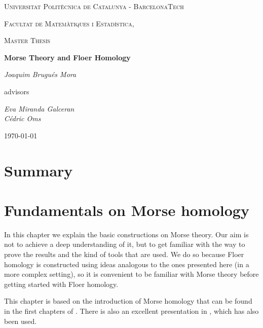 \documentclass[a4paper,11pt]{book}
\begin{document}
\begin{titlepage}
	\centering
	{\scshape\LARGE Universitat Politècnica de Catalunya - BarcelonaTech\par}
	{\scshape\LARGE Facultat de Matemàtiques i Estadística, \par}
	\vspace{1cm}
	{\scshape\Large Master Thesis\par}
	\vspace{1.5cm}
	{\huge\bfseries Morse Theory and Floer Homology\par}
	\vspace{2cm}
	{\Large\itshape Joaquim Brugués Mora\par}
	\vfill
	advisors\par
	{\Large\itshape Eva Miranda Galceran \\ Cédric Oms \par}

	\vfill

	{\large \today\par}
\end{titlepage}


\chapter*{Summary}


\tableofcontents

\mainmatter

\chapter{Fundamentals on Morse homology}
In this chapter we explain the basic constructions on Morse theory. Our aim is not to achieve a deep understanding of it, but to get familiar with the way to prove the results and the kind of tools that are used. We do so because Floer homology is constructed using ideas analogous to the ones presented here (in a more complex setting), so it is convenient to be familiar with Morse theory before getting started with Floer homology.

This chapter is based on the introduction of Morse homology that can be found in the first chapters of \cite{audin2014morse}. There is also an excellent presentation in \cite{milnor1963morse}, which has also been used.
\end{document}
